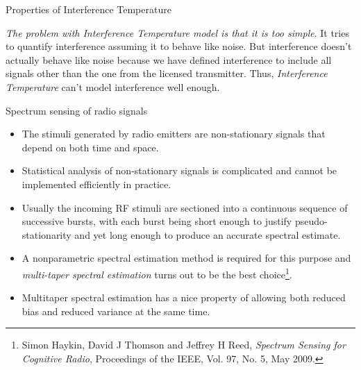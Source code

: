 \documentclass[mathserif]{beamer}
\begin{document}
\begin{frame}{Properties of Interference Temperature}

\emph{The problem with Interference Temperature model is that it is too simple}. It tries to quantify interference assuming it to behave like noise. But interference doesn't actually behave like noise because we have defined interference to include all signals other than the one from the licensed transmitter. Thus, \emph{Interference Temperature} can't model interference well enough.

\end{frame}




\begin{frame}{Spectrum sensing of radio signals}


\begin{itemize}

	\pause
	\item The stimuli generated by radio emitters are non-stationary signals that depend on both time and space.
	\pause
	\item Statistical analysis of non-stationary signals is complicated and cannot be implemented efficiently in practice. 
	\pause
	\item Usually the incoming RF stimuli are sectioned into a continuous sequence of successive bursts, with each burst being short enough to justify pseudo-stationarity and yet long enough to produce an accurate spectral estimate.
	\pause
	\item A nonparametric spectral estimation method is required for this purpose and \emph{multi-taper spectral estimation} turns out to be the best choice\footnote{Simon Haykin, David J Thomson and Jeffrey H Reed, \emph{Spectrum Sensing for Cognitive Radio}, Proceedings of the IEEE, Vol. 97, No. 5, May 2009.}. 
	\pause
	\item Multitaper spectral estimation has a nice property of allowing both reduced bias and reduced variance at the same time.

\end{itemize}
\end{frame}
\end{document}
